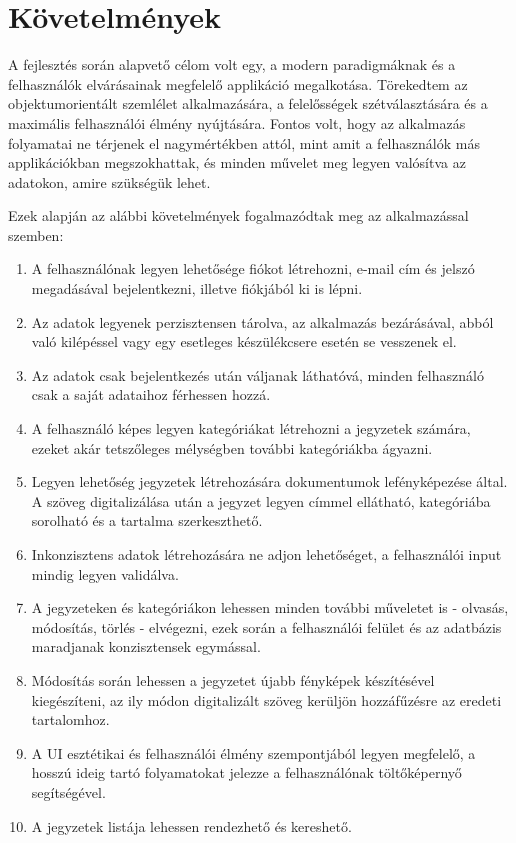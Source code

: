 \chapter{Követelmények}

A fejlesztés során alapvető célom volt egy, a modern paradigmáknak és a felhasználók elvárásainak megfelelő applikáció megalkotása. Törekedtem az objektumorientált szemlélet alkalmazására, a felelősségek szétválasztására és a maximális felhasználói élmény nyújtására. Fontos volt, hogy az alkalmazás folyamatai ne térjenek el nagymértékben attól, mint amit a felhasználók más applikációkban megszokhattak, és minden művelet meg legyen valósítva az adatokon, amire szükségük lehet.

Ezek alapján az alábbi követelmények fogalmazódtak meg az alkalmazással szemben:
\begin{enumerate}
	\item A felhasználónak legyen lehetősége fiókot létrehozni, e-mail cím és jelszó megadásával bejelentkezni, illetve fiókjából ki is lépni.
	\item Az adatok legyenek perzisztensen tárolva, az alkalmazás bezárásával, abból való kilépéssel vagy egy esetleges készülékcsere esetén se vesszenek el.
	\item Az adatok csak bejelentkezés után váljanak láthatóvá, minden felhasználó csak a saját adataihoz férhessen hozzá.
	\item A felhasználó képes legyen kategóriákat létrehozni a jegyzetek számára, ezeket akár tetszőleges mélységben további kategóriákba ágyazni.
	\item Legyen lehetőség jegyzetek létrehozására dokumentumok lefényképezése által. A szöveg digitalizálása után a jegyzet legyen címmel ellátható, kategóriába sorolható és a tartalma szerkeszthető.
	\item Inkonzisztens adatok létrehozására ne adjon lehetőséget, a felhasználói input mindig legyen validálva.
	\item A jegyzeteken és kategóriákon lehessen minden további műveletet is - olvasás, módosítás, törlés - elvégezni, ezek során a felhasználói felület és az adatbázis maradjanak konzisztensek egymással.
	\item Módosítás során lehessen a jegyzetet újabb fényképek készítésével kiegészíteni, az ily módon digitalizált szöveg kerüljön hozzáfűzésre az eredeti tartalomhoz.
	\item A UI esztétikai és felhasználói élmény szempontjából legyen megfelelő, a hosszú ideig tartó folyamatokat jelezze a felhasználónak töltőképernyő segítségével.
	\item A jegyzetek listája lehessen rendezhető és kereshető.
\end{enumerate}